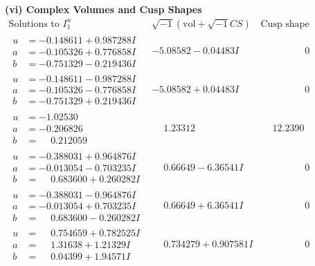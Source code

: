 \documentclass[1p]{elsarticle_modified}
\theoremstyle{definition}
\newcommand{\I}{\sqrt{-1}}
\begin{document}
\newpage\flushleft \textbf{(vi) Complex Volumes and Cusp Shapes}
$$\begin{array}{c|c|c}  
\text{Solutions to }I^u_{1}& \I (\text{vol} + \sqrt{-1}CS) & \text{Cusp shape}\\
 \hline 
\begin{aligned}
u &= -0.148611 + 0.987288 I \\
a &= -0.105326 + 0.776858 I \\
b &= -0.751329 - 0.219436 I\end{aligned}
 & -5.08582 - 0.04483 I & \phantom{-0.000000 } 0 \\ \hline\begin{aligned}
u &= -0.148611 - 0.987288 I \\
a &= -0.105326 - 0.776858 I \\
b &= -0.751329 + 0.219436 I\end{aligned}
 & -5.08582 + 0.04483 I & \phantom{-0.000000 } 0 \\ \hline\begin{aligned}
u &= -1.02530\phantom{ +0.000000I} \\
a &= -0.206826\phantom{ +0.000000I} \\
b &= \phantom{-}0.212059\phantom{ +0.000000I}\end{aligned}
 & \phantom{-}1.23312\phantom{ +0.000000I} & \phantom{-}12.2390\phantom{ +0.000000I} \\ \hline\begin{aligned}
u &= -0.388031 + 0.964876 I \\
a &= -0.013054 - 0.703235 I \\
b &= \phantom{-}0.683600 + 0.260282 I\end{aligned}
 & \phantom{-}0.66649 - 6.36541 I & \phantom{-0.000000 } 0 \\ \hline\begin{aligned}
u &= -0.388031 - 0.964876 I \\
a &= -0.013054 + 0.703235 I \\
b &= \phantom{-}0.683600 - 0.260282 I\end{aligned}
 & \phantom{-}0.66649 + 6.36541 I & \phantom{-0.000000 } 0 \\ \hline\begin{aligned}
u &= \phantom{-}0.754659 + 0.782525 I \\
a &= \phantom{-}1.31638 + 1.21329 I \\
b &= \phantom{-}0.04399 + 1.94571 I\end{aligned}
 & \phantom{-}0.734279 + 0.907581 I & \phantom{-0.000000 } 0 \\ \hline\begin{aligned}

\end{aligned}
\end{array}$$
\end{document}

